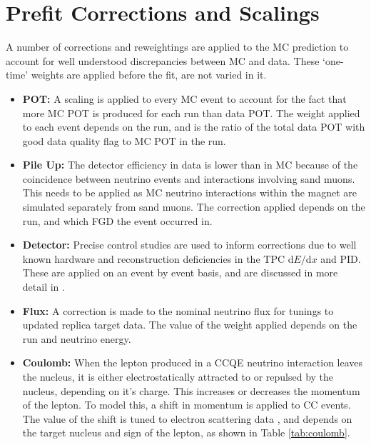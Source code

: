 \section{Prefit Corrections and Scalings}\label{sec:corr}

A number of corrections and reweightings are applied to the MC prediction to account for well understood discrepancies between MC and data. These `one-time' weights are applied before the fit, are not varied in it. 

\begin{itemize}

\item \textbf{POT: } A scaling is applied to every MC event to account for the fact that more MC POT is produced for each run than data POT. The weight applied to each event depends on the run, and is the ratio of the total data POT with good data quality flag to MC POT in the run.

\item \textbf{Pile Up: } The detector efficiency in data is lower than in MC because of the coincidence between neutrino events and interactions involving sand muons. This needs to be applied as MC neutrino interactions within the magnet are simulated separately from sand muons. The correction applied depends on the run, and which FGD the event occurred in.

\item \textbf{Detector: } Precise control studies are used to inform corrections due to well known hardware and reconstruction deficiencies in the TPC d$E/$d$x$ and PID. These are applied on an event by event basis, and are discussed in more detail in \cite{tn212}.

\item \textbf{Flux: } A correction is made to the nominal neutrino flux for tunings to updated replica target data. The value of the weight applied depends on the run and neutrino energy.

\item \textbf{Coulomb: } When the lepton produced in a CCQE neutrino interaction leaves the nucleus, it is either electrostatically attracted to or repulsed by the nucleus, depending on it's charge. This increases or decreases the momentum of the lepton. To model this, a shift in momentum is applied to CC events. The value of the shift is tuned to electron scattering data \cite{coulombcorr}, and depends on the target nucleus and sign of the lepton, as shown in Table \ref{tab:coulomb}.


\end{itemize}
